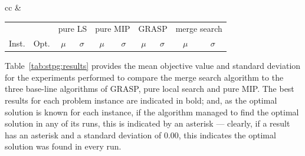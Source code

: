 \documentclass[authoryear,11pt,square,number,times,super,comma]{elsarticle}
\begin{document}
\begin{table}[h]
\begin{tabular}{cc}
&
\centering
\begin{adjustbox}{width=0.48\textwidth}
\begin{tabular}{lrrrrrrrrr} \toprule
 &  & \multicolumn{2}{c}{pure LS} & \multicolumn{2}{c}{pure MIP} & \multicolumn{2}{c}{GRASP} & \multicolumn{2}{c}{merge search}\\
\cmidrule(lr){3-4} \cmidrule(lr){5-6} \cmidrule(lr){7-8} \cmidrule(lr){9-10} 
Inst. & Opt. & \multicolumn{1}{c}{\(\mu\)}&\multicolumn{1}{c}{\(\sigma\)} & \multicolumn{1}{c}{\(\mu\)}&\multicolumn{1}{c}{\(\sigma\)}& \multicolumn{1}{c}{\(\mu\)}&\multicolumn{1}{c}{\(\sigma\)} & \multicolumn{1}{c}{\(\mu\)}&\multicolumn{1}{c}{\(\sigma\)}\\ \midrule
%

%
\bottomrule
\end{tabular}
\end{adjustbox}

\end{tabular}
\end{table}

Table~\ref{tab:stpg:results} provides the mean objective value and standard deviation for the experiments performed to compare the merge search algorithm to the three base-line algorithms of GRASP, pure local search and pure MIP. The best results for each problem instance are indicated in bold; and, as the optimal solution is known for each instance, if the algorithm managed to find the optimal solution in any of its runs, this is indicated by an asterisk --- clearly, if a result has an asterisk and a standard deviation of 0.00, this indicates the optimal solution was found in every run.
\end{document}
